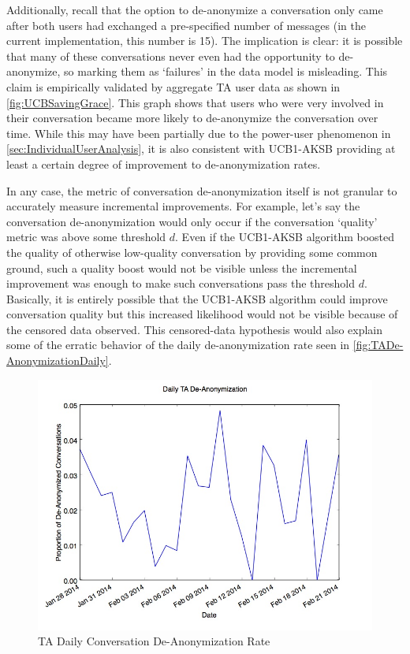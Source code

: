 Additionally, recall that the option to de-anonymize a conversation only came after both users had exchanged a pre-specified number of messages (in the current implementation, this number is 15). The implication is clear: it is possible that many of these conversations never even had the opportunity to de-anonymize, so marking them as `failures' in the data model is misleading. This claim is empirically validated by aggregate TA user data as shown in \autoref{fig:UCBSavingGrace}. This graph shows that users who were very involved in their conversation became more likely to de-anonymize the conversation over time. While this may have been partially due to the power-user phenomenon in \autoref{sec:IndividualUserAnalysis}, it is also consistent with UCB1-AKSB providing at least a certain degree of improvement to de-anonymization rates.

In any case, the metric of conversation de-anonymization itself is not granular to accurately measure incremental improvements. For example, let's say the conversation de-anonymization would only occur if the conversation `quality' metric was above some threshold $d$. Even if the UCB1-AKSB algorithm boosted the quality of otherwise low-quality conversation by providing some common ground, such a quality boost would not be visible unless the incremental improvement was enough to make such conversations pass the threshold $d$. Basically, it is entirely possible that the UCB1-AKSB algorithm could improve conversation quality but this increased likelihood would not be visible because of the censored data observed. This censored-data hypothesis would also explain some of the erratic behavior of the daily de-anonymization rate seen in \autoref{fig:TADe-AnonymizationDaily}.

\begin{figure}[H]
\centering
\includegraphics[trim= 0mm 0mm 0mm 0mm, clip, scale=0.5]{./Figures/DailyTADe-Anonymization.jpg}
\caption{TA Daily Conversation De-Anonymization Rate}
\label{fig:TADe-AnonymizationDaily}
\end{figure}


